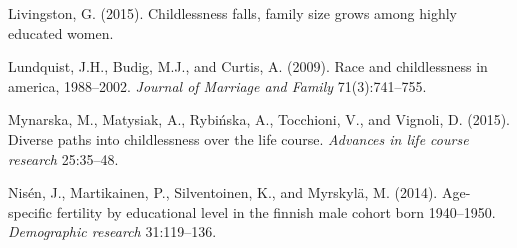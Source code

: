 \documentclass[
  11pt,
  letterpaper,
]{article}
\newlength{\cslhangindent}
\newlength{\cslentryspacingunit} %
\newenvironment{CSLReferences}[2] %
 {%
  \setlength{\parindent}{0pt}
  \ifodd #1
  \let\oldpar\par
  \def\par{\hangindent=\cslhangindent\oldpar}
  \fi
  \setlength{\parskip}{#2\cslentryspacingunit}
 }%
 {}
\begin{document}
\begin{CSLReferences}{1}{0}
\leavevmode{}%
Livingston, G. (2015). Childlessness falls, family size grows among highly educated women.

\leavevmode{}%
Lundquist, J.H., Budig, M.J., and Curtis, A. (2009). Race and childlessness in america, 1988--2002. \emph{Journal of Marriage and Family} 71(3):741--755.

\leavevmode{}%
Mynarska, M., Matysiak, A., Rybińska, A., Tocchioni, V., and Vignoli, D. (2015). Diverse paths into childlessness over the life course. \emph{Advances in life course research} 25:35--48.

\leavevmode{}%
Nisén, J., Martikainen, P., Silventoinen, K., and Myrskylä, M. (2014). Age-specific fertility by educational level in the finnish male cohort born 1940--1950. \emph{Demographic research} 31:119--136.

\end{CSLReferences}
\end{document}
